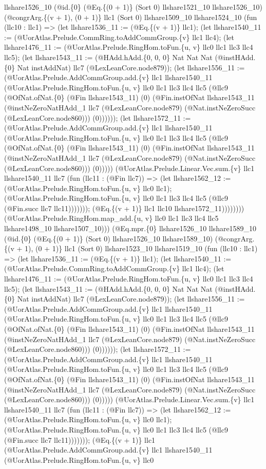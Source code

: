 \documentclass[11pt]{article}
\begin{document}
llshare1526\_10 (@id.\{0\} (@Eq.\{(0 + 1)\} (Sort 0) llshare1521\_10 llshare1526\_10) (@congrArg.\{(v + 1), (0 + 1)\} llc1 (Sort 0) llshare1509\_10 llshare1524\_10 (fun (llc10 : llc1) => (let llshare1536\_11 := (@Eq.\{(v + 1)\} llc1); (let llshare1540\_11 := (@UorAtlas.Prelude.CommRing.toAddCommGroup.\{v\} llc1 llc4); (let llshare1476\_11 := (@UorAtlas.Prelude.RingHom.toFun.\{u, v\} llc0 llc1 llc3 llc4 llc5); (let llshare1543\_11 := (@HAdd.hAdd.\{0, 0, 0\} Nat Nat Nat (@instHAdd.\{0\} Nat instAddNat) llc7 (@LexLeanCore.node879)); (let llshare1556\_11 := (@UorAtlas.Prelude.AddCommGroup.add.\{v\} llc1 llshare1540\_11 (@UorAtlas.Prelude.RingHom.toFun.\{u, v\} llc0 llc1 llc3 llc4 llc5 (@llc9 (@OfNat.ofNat.\{0\} (@Fin llshare1543\_11) (0) (@Fin.instOfNat llshare1543\_11 (@instNeZeroNatHAdd\_1 llc7 (@LexLeanCore.node879) (@Nat.instNeZeroSucc (@LexLeanCore.node860))) (0)))))); (let llshare1572\_11 := (@UorAtlas.Prelude.AddCommGroup.add.\{v\} llc1 llshare1540\_11 (@UorAtlas.Prelude.RingHom.toFun.\{u, v\} llc0 llc1 llc3 llc4 llc5 (@llc9 (@OfNat.ofNat.\{0\} (@Fin llshare1543\_11) (0) (@Fin.instOfNat llshare1543\_11 (@instNeZeroNatHAdd\_1 llc7 (@LexLeanCore.node879) (@Nat.instNeZeroSucc (@LexLeanCore.node860))) (0))))) (@UorAtlas.Prelude.Linear.Vec.sum.\{v\} llc1 llshare1540\_11 llc7 (fun (llc11 : (@Fin llc7)) => (let llshare1562\_12 := (@UorAtlas.Prelude.RingHom.toFun.\{u, v\} llc0 llc1); (@UorAtlas.Prelude.RingHom.toFun.\{u, v\} llc0 llc1 llc3 llc4 llc5 (@llc9 (@Fin.succ llc7 llc11))))))); (@Eq.\{(v + 1)\} llc1 llc10 llshare1572\_11)))))))) (@UorAtlas.Prelude.RingHom.map\_add.\{u, v\} llc0 llc1 llc3 llc4 llc5 llshare1498\_10 llshare1507\_10))) (@Eq.mpr.\{0\} llshare1526\_10 llshare1589\_10 (@id.\{0\} (@Eq.\{(0 + 1)\} (Sort 0) llshare1526\_10 llshare1589\_10) (@congrArg.\{(v + 1), (0 + 1)\} llc1 (Sort 0) llshare1523\_10 llshare1519\_10 (fun (llc10 : llc1) => (let llshare1536\_11 := (@Eq.\{(v + 1)\} llc1); (let llshare1540\_11 := (@UorAtlas.Prelude.CommRing.toAddCommGroup.\{v\} llc1 llc4); (let llshare1476\_11 := (@UorAtlas.Prelude.RingHom.toFun.\{u, v\} llc0 llc1 llc3 llc4 llc5); (let llshare1543\_11 := (@HAdd.hAdd.\{0, 0, 0\} Nat Nat Nat (@instHAdd.\{0\} Nat instAddNat) llc7 (@LexLeanCore.node879)); (let llshare1556\_11 := (@UorAtlas.Prelude.AddCommGroup.add.\{v\} llc1 llshare1540\_11 (@UorAtlas.Prelude.RingHom.toFun.\{u, v\} llc0 llc1 llc3 llc4 llc5 (@llc9 (@OfNat.ofNat.\{0\} (@Fin llshare1543\_11) (0) (@Fin.instOfNat llshare1543\_11 (@instNeZeroNatHAdd\_1 llc7 (@LexLeanCore.node879) (@Nat.instNeZeroSucc (@LexLeanCore.node860))) (0)))))); (let llshare1572\_11 := (@UorAtlas.Prelude.AddCommGroup.add.\{v\} llc1 llshare1540\_11 (@UorAtlas.Prelude.RingHom.toFun.\{u, v\} llc0 llc1 llc3 llc4 llc5 (@llc9 (@OfNat.ofNat.\{0\} (@Fin llshare1543\_11) (0) (@Fin.instOfNat llshare1543\_11 (@instNeZeroNatHAdd\_1 llc7 (@LexLeanCore.node879) (@Nat.instNeZeroSucc (@LexLeanCore.node860))) (0))))) (@UorAtlas.Prelude.Linear.Vec.sum.\{v\} llc1 llshare1540\_11 llc7 (fun (llc11 : (@Fin llc7)) => (let llshare1562\_12 := (@UorAtlas.Prelude.RingHom.toFun.\{u, v\} llc0 llc1); (@UorAtlas.Prelude.RingHom.toFun.\{u, v\} llc0 llc1 llc3 llc4 llc5 (@llc9 (@Fin.succ llc7 llc11))))))); (@Eq.\{(v + 1)\} llc1 (@UorAtlas.Prelude.AddCommGroup.add.\{v\} llc1 llshare1540\_11 (@UorAtlas.Prelude.RingHom.toFun.\{u, v\} llc0 
\end{document}
